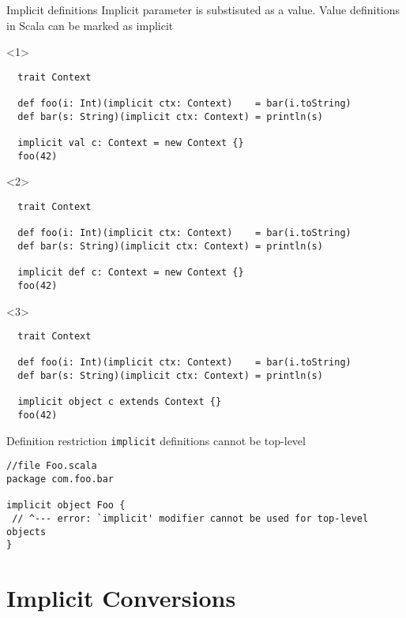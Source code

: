 \documentclass[aspectratio=169]{beamer}
\begin{document}
\begin{frame}[fragile]{Implicit definitions}
Implicit parameter is substisuted as a value. Value definitions in Scala can be marked as 
\alert{implicit} \vspace{1em}
\begin{onlyenv}<1>
  \begin{verbatim}
  trait Context
  
  def foo(i: Int)(implicit ctx: Context)    = bar(i.toString)
  def bar(s: String)(implicit ctx: Context) = println(s)
  
  implicit val c: Context = new Context {}
  foo(42)
  \end{verbatim}
\end{onlyenv}
\begin{onlyenv}<2>
 \begin{verbatim}
  trait Context
  
  def foo(i: Int)(implicit ctx: Context)    = bar(i.toString)
  def bar(s: String)(implicit ctx: Context) = println(s)
  
  implicit def c: Context = new Context {}
  foo(42)
  \end{verbatim} 
\end{onlyenv}
\begin{onlyenv}<3>
 \begin{verbatim}
  trait Context
  
  def foo(i: Int)(implicit ctx: Context)    = bar(i.toString)
  def bar(s: String)(implicit ctx: Context) = println(s)
  
  implicit object c extends Context {}
  foo(42)
  \end{verbatim} 
\end{onlyenv}
\end{frame}

\begin{frame}[fragile]{Definition restriction}
\texttt{implicit} definitions cannot be top-level
\bigskip
\begin{verbatim}
//file Foo.scala
package com.foo.bar

implicit object Foo { 
 // ^--- error: `implicit' modifier cannot be used for top-level objects
}
\end{verbatim}
\end{frame}

\section{Implicit Conversions}
\end{document}
